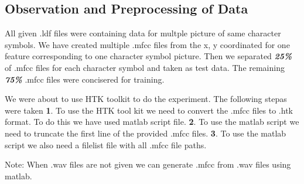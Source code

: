 \subsection{Observation and Preprocessing of Data}
\begin{flushleft}
    
    All given .ldf files were containing data for multple picture of same character symbols.
  We have created multiple .mfcc files from the x, y coordinated for one feature corresponding 
  to one character symbol picture.
  Then we separated \textbf{\textit{25\%}} of .mfcc files for each character symbol and taken as test data.
  The remaining \textbf{\textit{75\%}} .mfcc files were concisered for training.

  We were about to use HTK toolkit to do the experiment.
  The following stepas were taken\break
  \textbf{1}. To use the HTK tool kit we need to convert the .mfcc files to .htk format. To do this we have used matlab script file.\break
  \textbf{2}. To use the matlab script we need to truncate the first line of the provided .mfcc files.\break
  \textbf{3}. To use the matlab script we also need a filelist file with all .mfcc file paths.\break

  Note: When .wav files are not given we can generate .mfcc from .wav files using matlab.
\end{flushleft}

